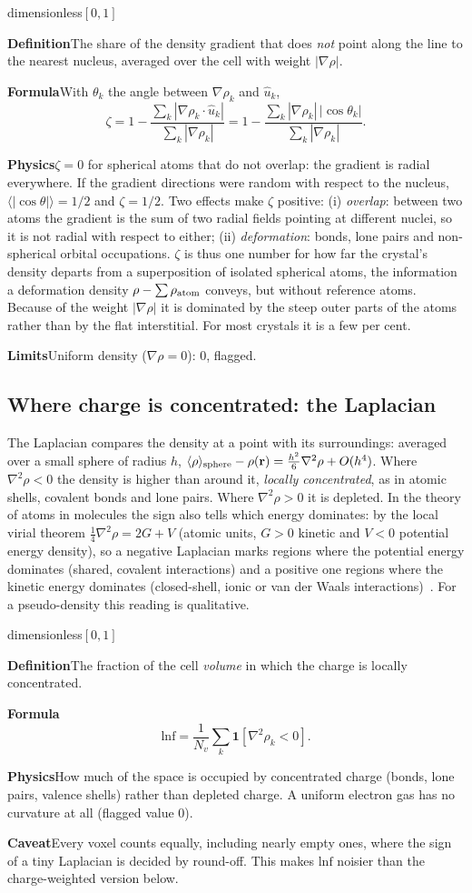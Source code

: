\documentclass[11pt,a4paper]{article}
\newcommand{\dn}[1]{\texttt{\detokenize{#1}}}
\newcommand{\desc}[3]{\par\needspace{7\baselineskip}\vspace{1.3ex}%
  \phantomsection\label{d:#1}%
  \noindent\parbox[t]{0.68\linewidth}{\raggedright\color{MidnightBlue}\large\bfseries\dn{#2}}%
  \hfill\parbox[t]{0.30\linewidth}{\raggedleft\small\color{black!60}#3}\par
  \vspace{-0.5ex}{\color{MidnightBlue!35}\hrule height 0.5pt}\vspace{0.5ex}}
\newcommand{\lab}[1]{{\small\sffamily\bfseries\color{MidnightBlue}#1}\enspace}
\newcommand{\Def}{\par\lab{Definition}}
\newcommand{\Frm}{\par\lab{Formula}}
\newcommand{\Phy}{\par\lab{Physics}}
\newcommand{\Lim}{\par\lab{Limits}}
\newcommand{\Cav}{\par\lab{Caveat}}
\newcommand{\sumk}{\sum_{k}}
\begin{document}
\desc{zeta}{zeta}{dimensionless\quad$[0,1]$}
\Def The share of the density gradient that does \emph{not} point along the line to the nearest
nucleus, averaged over the cell with weight $|\nabla\rho|$.
\Frm With $\theta_k$ the angle between $\nabla\rho_k$ and $\hat u_k$,
\[
\zeta = 1-\frac{\sumk|\nabla\rho_k\cdot\hat u_k|}{\sumk|\nabla\rho_k|}
      = 1-\frac{\sumk|\nabla\rho_k|\,|\cos\theta_k|}{\sumk|\nabla\rho_k|}.
\]
\Phy $\zeta=0$ for spherical atoms that do not overlap: the gradient is radial everywhere. If the
gradient directions were random with respect to the nucleus, $\langle|\cos\theta|\rangle=1/2$ and
$\zeta=1/2$. Two effects make $\zeta$ positive: (i) \emph{overlap}: between two atoms the gradient is
the sum of two radial fields pointing at different nuclei, so it is not radial with respect to
either; (ii) \emph{deformation}: bonds, lone pairs and non-spherical orbital occupations. $\zeta$
is thus one number for how far the crystal's density departs from a superposition of isolated
spherical atoms, the information a deformation density $\rho-\sum\rho_{\rm atom}$ conveys, but
without reference atoms. Because of the weight $|\nabla\rho|$ it is dominated by the steep outer
parts of the atoms rather than by the flat interstitial. For most crystals it is a few per cent.
\Lim Uniform density ($\nabla\rho=0$): 0, flagged.

\subsection{Where charge is concentrated: the Laplacian}
The Laplacian compares the density at a point with its surroundings: averaged over a small sphere
of radius $h$, $\langle\rho\rangle_{\rm sphere}-\rho(\mathbf r)=\tfrac{h^2}{6}\nabla^2\rho+O(h^4)$.
Where $\nabla^2\rho<0$ the density is higher than around it, \emph{locally concentrated}, as in
atomic shells, covalent bonds and lone pairs. Where $\nabla^2\rho>0$ it is depleted. In the theory
of atoms in molecules the sign also tells which energy dominates: by the local virial theorem
$\tfrac14\nabla^2\rho=2G+V$ (atomic units, $G>0$ kinetic and $V<0$ potential energy density), so a
negative Laplacian marks regions where the potential energy dominates (shared, covalent
interactions) and a positive one regions where the kinetic energy dominates (closed-shell, ionic or
van der Waals interactions)~\cite{bader,baderessen}. For a pseudo-density this reading is qualitative.

\desc{lnf}{lnf}{dimensionless\quad$[0,1]$}
\Def The fraction of the cell \emph{volume} in which the charge is locally concentrated.
\Frm
\[
\mathrm{lnf}=\frac{1}{N_v}\sumk \mathbf 1\!\left[\nabla^2\rho_k<0\right].
\]
\Phy How much of the space is occupied by concentrated charge (bonds, lone pairs, valence shells)
rather than depleted charge. A uniform electron gas has no curvature at all (flagged value 0).
\Cav Every voxel counts equally, including nearly empty ones, where the sign of a tiny Laplacian is
decided by round-off. This makes $\mathrm{lnf}$ noisier than the charge-weighted version below.
\end{document}
